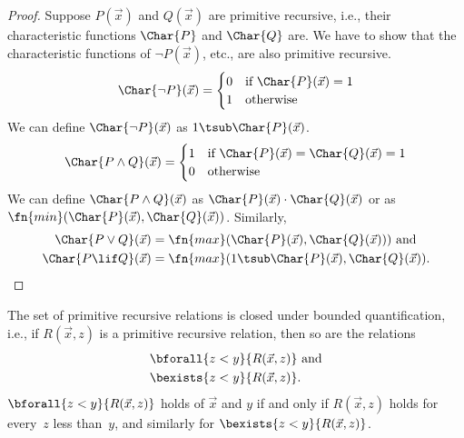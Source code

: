 \documentclass[../../../include/open-logic-section]{subfiles}
\begin{document}
\begin{proof}
  Suppose $P(\vec x)$ and $Q(\vec x)$ are primitive recursive, i.e.,
  their characteristic functions $\Char{P}$ and $\Char{Q}$ are.  We
  have to show that the characteristic functions of $\lnot P(\vec x)$,
  etc., are also primitive recursive.
  \[
  \Char{\lnot P}(\vec x) = \begin{cases}
    0 & \text{if $\Char{P}(\vec x) = 1$}\\
    1 & \text{otherwise}
  \end{cases}
  \]
  We can define $\Char{\lnot P}(\vec x)$ as $1 \tsub \Char{P}(\vec x)$.
  \[
  \Char{P \land Q}(\vec x) = \begin{cases}
    1 & \text{if $\Char{P}(\vec x) = \Char{Q}(\vec x) = 1$}\\
    0 & \text{otherwise}
  \end{cases}
  \]
  We can define $\Char{P \land Q}(\vec x)$ as $\Char{P}(\vec x) \cdot
  \Char{Q}(\vec x)$ or as $\fn{min}(\Char{P}(\vec x), \Char{Q}(\vec
  x))$. Similarly, 
  \begin{align*}
    \Char{P \lor Q}(\vec x) & = \fn{max}(\Char{P}(\vec x), \Char{Q}(\vec x))) \text{ and}\\
    \Char{P \lif Q}(\vec x) & = \fn{max}(1 \tsub
  \Char{P}(\vec x), \Char{Q}(\vec x)).
  \end{align*}
\end{proof}

\begin{prop}
  The set of primitive recursive relations is closed under bounded
  quantification, i.e., if $R(\vec x, z)$ is a primitive recursive
  relation, then so are the relations
  \begin{align*}
    & \bforall{z < y}{R(\vec x, z)} \text{ and}\\
    & \bexists{z < y}{R(\vec x, z)}.
  \end{align*}
  $\bforall{z < y}{R(\vec x, z)}$ holds of $\vec x$ and $y$ if and
  only if $R(\vec x, z)$ holds for every~$z$ less than~$y$, and
  similarly for $\bexists{z < y}{R(\vec x, z)}$.
\end{prop}
\end{document}
